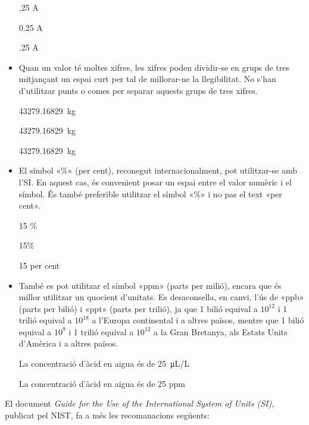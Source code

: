 \begin{itemize}
\textcolor{Red}\faTimesCircle{}  ,25 A

\textcolor{Green}\faCheckSquare{} 0.25 A

\textcolor{Red}\faTimesCircle{}  .25 A


\item Quan un valor té moltes xifres, les xifres poden dividir-se en grups de tres mitjançant un espai curt per tal de millorar-ne la llegibilitat. No s'han d'utilitzar punts o comes per separar aquests grups de tres xifres.

\textcolor{Green}\faCheckSquare{} \qty{43279,16829}{kg}

\textcolor{Green}\faCheckSquare{} \qty[group-separator =]{43279,16829}{kg}

\textcolor{Red}\faTimesCircle{}  \qty[group-separator = .]{43279,16829}{kg}

\item El símbol «\%» (per cent), reconegut internacionalment, pot utilitzar-se amb l'SI. En aquest cas, és convenient posar un espai entre el valor numèric i el símbol. És també preferible utilitzar el símbol «\%» i no pas el text  «per cent».

\textcolor{Green}\faCheckSquare{} 15 \%

\textcolor{Blue}\faExclamationTriangle{} 15\%

\textcolor{Blue}\faExclamationTriangle{} 15 per cent


\item També es pot utilitzar el símbol «ppm» (parts per milió), encara que és millor utilitzar un quocient d'unitats. Es desaconsella, en canvi, l'ús de «ppb» (parts per bilió) i «ppt» (parts per trilió), ja que 1 bilió equival a $10^{12}$ i 1 trilió equival a $10^{18}$ a l'Europa continental i a altres països, mentre que 1 bilió equival a $10^{9}$ i 1 trilió equival a $10^{12}$ a la Gran Bretanya, als Estats Units d'Amèrica i a altres països.

\textcolor{Green}\faCheckSquare{} La concentració d'àcid en aigua és de \qty{25}{\micro L/L}

\textcolor{Blue}\faExclamationTriangle{} La concentració d'àcid en aigua és de 25 ppm

\end{itemize}


El document  \textit{Guide for the Use of the International System of Units (SI)}, publicat pel NIST,  fa a més les recomanacions següents:

